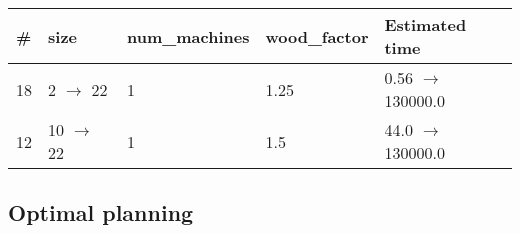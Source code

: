 \documentclass{article}
\begin{document}
                            \begin{center}
                            \begin{tabular}{@{}l|l|l|l|l@{}}
                            \# & size & num\_machines & wood\_factor & Estimated time\\\midrule
                            18&2 $\rightarrow$ 22&1&1.25&0.56 $\rightarrow$ 130000.0\\
12&10 $\rightarrow$ 22&1&1.5&44.0 $\rightarrow$ 130000.0
                            \end{tabular}
                            \end{center}
                    
                                \subsection*{Optimal planning}
                                
\end{document}
